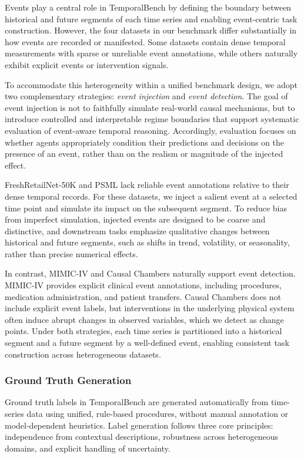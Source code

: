 Events play a central role in TemporalBench by defining the boundary between historical and future segments of each time series and enabling event-centric task construction.
However, the four datasets in our benchmark differ substantially in how events are recorded or manifested.
Some datasets contain dense temporal measurements with sparse or unreliable event annotations, while others naturally exhibit explicit events or intervention signals.

To accommodate this heterogeneity within a unified benchmark design, we adopt two complementary strategies: \emph{event injection} and \emph{event detection}.
The goal of event injection is not to faithfully simulate real-world causal mechanisms, but to introduce controlled and interpretable regime boundaries that support systematic evaluation of event-aware temporal reasoning.
Accordingly, evaluation focuses on whether agents appropriately condition their predictions and decisions on the presence of an event, rather than on the realism or magnitude of the injected effect.

FreshRetailNet-50K and PSML lack reliable event annotations relative to their dense temporal records.
For these datasets, we inject a salient event at a selected time point and simulate its impact on the subsequent segment.
To reduce bias from imperfect simulation, injected events are designed to be coarse and distinctive, and downstream tasks emphasize qualitative changes between historical and future segments, such as shifts in trend, volatility, or seasonality, rather than precise numerical effects.

In contrast, MIMIC-IV and Causal Chambers naturally support event detection.
MIMIC-IV provides explicit clinical event annotations, including procedures, medication administration, and patient transfers.
Causal Chambers does not include explicit event labels, but interventions in the underlying physical system often induce abrupt changes in observed variables, which we detect as change points.
Under both strategies, each time series is partitioned into a historical segment and a future segment by a well-defined event, enabling consistent task construction across heterogeneous datasets.

\subsubsection{Ground Truth Generation}

Ground truth labels in TemporalBench are generated automatically from time-series data using unified, rule-based procedures, without manual annotation or model-dependent heuristics.
Label generation follows three core principles: independence from contextual descriptions, robustness across heterogeneous domains, and explicit handling of uncertainty.

